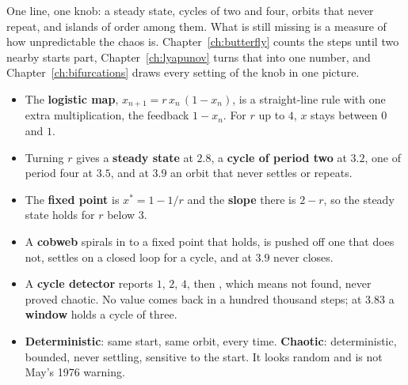 \noindent
One line, one knob: a steady state, cycles of two and four, orbits that
never repeat, and islands of order among them. What is still missing is a
measure of how unpredictable the chaos is. Chapter~\ref{ch:butterfly}
counts the steps until two nearby starts part, Chapter~\ref{ch:lyapunov}
turns that into one number, and Chapter~\ref{ch:bifurcations} draws every
setting of the knob in one picture.

\begin{summarybox}
\begin{itemize}
\item The \textbf{logistic map}, $x_{n+1} = r\,x_n\,(1 - x_n)$, is a
  straight-line rule with one extra multiplication, the feedback $1 - x_n$.
  For $r$ up to $4$, $x$ stays between $0$ and $1$.
\item Turning $r$ gives a \textbf{steady state} at $\num{2.8}$, a
  \textbf{cycle of period two} at $\num{3.2}$, one of period four at
  $\num{3.5}$, and at $\num{3.9}$ an orbit that never settles or repeats.
\item The \textbf{fixed point} is $x^{*} = 1 - 1/r$ and the \textbf{slope}
  there is $2 - r$, so the steady state holds for $r$ below $3$.
\item A \textbf{cobweb} spirals in to a fixed point that holds, is pushed
  off one that does not, settles on a closed loop for a cycle, and at
  $\num{3.9}$ never closes.
\item A \textbf{cycle detector} reports $1$, $2$, $4$, then ,
  which means not found, never proved chaotic. No value comes back in a
  hundred thousand steps; at $\num{3.83}$ a \textbf{window} holds a cycle of
  three.
\item \textbf{Deterministic}: same start, same orbit, every time.
  \textbf{Chaotic}: deterministic, bounded, never settling, sensitive to the
  start. It looks random and is not \dash{} May's 1976 warning.
\end{itemize}
\end{summarybox}

\canyou

